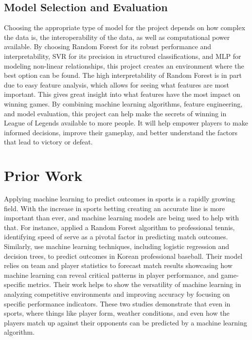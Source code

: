 \documentclass[10pt,twocolumn]{article}
\begin{document}
\subsection{Model Selection and Evaluation}
Choosing the appropriate type of model for the project depends on how complex the data is, the interoperability of the data, as well as computational power available. By choosing Random Forest for its robust performance and interpretability, SVR for its precision in structured classifications, and MLP for modeling non-linear relationships, this project creates an environment where the best option can be found. The high interpretability of Random Forest is in part due to easy feature analysis, which allows for seeing what features are most important. This gives great insight into what features have the most impact on winning games.
By combining machine learning algorithms, feature engineering, and model evaluation, this project can help make the secrets of winning in League of Legends available to more people. It will help empower players to make informed decisions, improve their gameplay, and better understand the factors that lead to victory or defeat.



\section{Prior Work}

Applying machine learning to predict outcomes in sports is a rapidly growing field. With the increase in sports betting creating an accurate line is more important than ever, and machine learning models are being used to help with that. For instance, \cite{Gao2021} applied a Random Forest algorithm to professional tennis, identifying speed of serve as a pivotal factor in predicting match outcomes. Similarly, \cite{SeoYeong-Jin2019} use machine learning techniques, including logistic regression and decision trees, to predict outcomes in Korean professional baseball. Their model relies on team and player statistics to forecast match results  showcasing how machine learning can reveal critical patterns in player performance, and game-specific metrics. Their work helps to show the versatility of machine learning in analyzing competitive environments and improving accuracy by focusing on specific performance indicators. These two studies demonstrate that even in sports, where things like player form, weather conditions, and even how the players match up against their opponents can be predicted by a machine learning algorithm.
\end{document}
